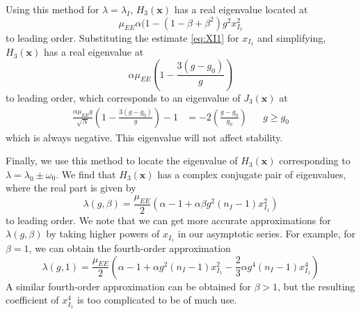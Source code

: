 \documentclass[11pt,reqno]{amsart}
\newcommand{\xvec}{\mathbf{x}}
\begin{document}
Using this method for $\lambda = \lambda_I$, $H_3(\xvec)$ has a real eigenvalue located at 
\[
\mu_{EE} \alpha(1 - (1-\beta+\beta^2)g^2 x_{I_1}^2
\]
to leading order. Substituting the estimate \cref{eq:XI1} for $x_{I_1}$ and simplifying, $H_3(\xvec)$ has a real eigenvalue at 
\[
\alpha \mu_{EE} \left( 1 - \frac{3(g-g_0)}{g}\right)
\]
to leading order, which corresponds to an eigenvalue of $J_3(\xvec)$ at 
\begin{align*}
\frac{\alpha \mu_{EE} g}{\sqrt{N}} \left( 1 - \frac{3(g-g_0)}{g}\right) - 1 &= -2\left( \frac{g - g_0}{g_0} \right)  && g \geq g_0
\end{align*}
which is always negative. This eigenvalue will not affect stability.

Finally, we use this method to locate the eigenvalue of $H_3(\xvec)$ corresponding to $\lambda = \lambda_0 \pm \omega_0$. We find that $H_3(\xvec)$ has a complex conjugate pair of eigenvalues, where the real part is given by
\begin{equation}
\lambda(g, \beta) = \frac{\mu_{EE}}{2}\left( \alpha - 1 + \alpha \beta g^2 (n_I-1) x_{I_1}^2 \right)
\end{equation}
to leading order. We note that we can get more accurate approximations for $\lambda(g, \beta)$ by taking higher powers of $x_{I_1}$ in our asymptotic series. For example, for $\beta=1$, we can obtain the fourth-order approximation
\[
\lambda(g, 1) = \frac{\mu_{EE}}{2}\left( \alpha - 1 + \alpha g^2 (n_I-1) x_{I_1}^2 - \frac{2}{3}\alpha g^4 (n_I-1) x_{I_1}^4 \right)
\]
A similar fourth-order approximation can be obtained for $\beta>1$, but the resulting coefficient of $x_{I_1}^4$ is too complicated to be of much use.
\end{document}
